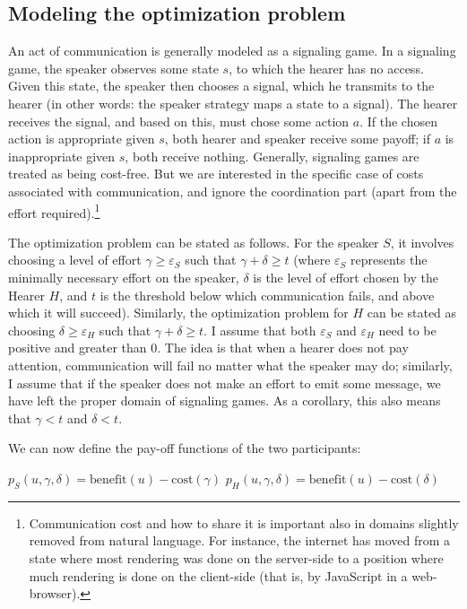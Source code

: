 \documentclass[output=paper,hidelinks]{langscibook}
\begin{document}
\subsection{Modeling the optimization problem}
\label{sec:optimization-problem}

An act of communication is generally modeled as a signaling game. In a signaling game, the speaker observes some state $s$, to which the hearer has no access. Given this state, the speaker then chooses a signal, which he transmits to the hearer (in other words: the speaker strategy maps a state to a signal). The hearer receives the signal, and based on this, must chose some action $a$. If the chosen action is appropriate given $s$, both hearer and speaker receive some payoff; if $a$ is inappropriate given $s$, both receive nothing. Generally, signaling games are treated as being cost-free. But we are interested in the specific case of costs associated with communication, and ignore the coordination part (apart from the effort required).\footnote{Communication cost and how to share it is important also in domains slightly removed from natural language. For instance, the internet has moved from a state where most rendering was done on the server-side to a position where much rendering is done on the client-side (that is, by JavaScript in a web-browser).}

The optimization problem can be stated as follows. For the speaker $S$, it involves choosing a level of effort $γ \geq ε_S$ such that $γ + δ \geq t$ (where $ε_S$ represents the minimally necessary effort on the speaker, $δ$ is the level of effort chosen by the Hearer $H$, and $t$ is the threshold below which communication fails, and above which it will succeed). Similarly, the optimization problem for $H$ can be stated as choosing $δ \geq ε_H$ such that $γ + δ \geq t$. I assume that both $ε_S$ and $ε_H$ need to be positive and greater than 0. The idea is that when a hearer does not pay attention, communication will fail no matter what the speaker may do; similarly, I assume that if the speaker does not make an effort to emit some message, we have left the proper domain of signaling games. As a corollary, this also means that $γ < t$ and $δ < t$.

We can now define the pay-off functions of the two participants:

\begin{exe}
  \ex \label{ex:payoff-func}
  \begin{xlist}
  \ex $p_S(u, γ, δ) = \text{benefit}(u) - \text{cost}(γ)$
  \ex $p_H(u, γ, δ) = \text{benefit}(u) - \text{cost}(δ)$
  \end{xlist}
\end{exe}
\end{document}
